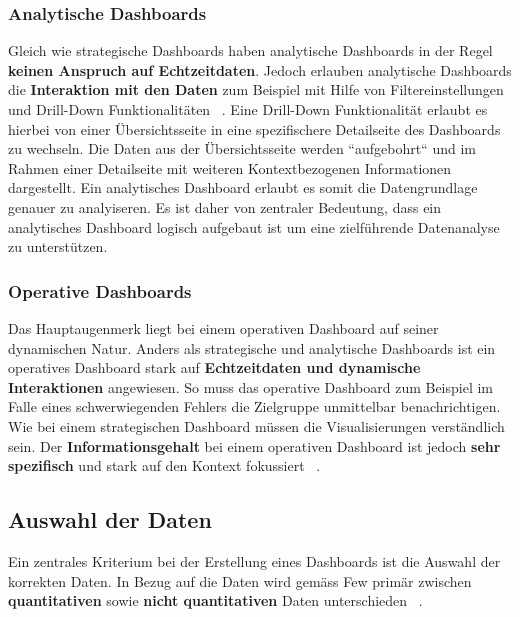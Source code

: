 \subsubsection{Analytische Dashboards}
Gleich wie strategische Dashboards haben analytische Dashboards in der Regel \textbf{keinen Anspruch auf Echtzeitdaten}. Jedoch erlauben analytische Dashboards die \textbf{Interaktion mit den Daten} zum Beispiel mit Hilfe von Filtereinstellungen und Drill-Down Funktionalitäten ~\citep[S. 41]{information_dashboard_design}. Eine Drill-Down Funktionalität erlaubt es hierbei von einer Übersichtsseite in eine spezifischere Detailseite des Dashboards zu wechseln. Die Daten aus der Übersichtsseite werden ``aufgebohrt`` und im Rahmen einer Detailseite mit weiteren Kontextbezogenen Informationen dargestellt. Ein analytisches Dashboard erlaubt es somit die Datengrundlage genauer zu analyiseren. Es ist daher von zentraler Bedeutung, dass ein analytisches Dashboard logisch aufgebaut ist um eine zielführende Datenanalyse zu unterstützen.

\subsubsection{Operative Dashboards}
Das Hauptaugenmerk liegt bei einem operativen Dashboard auf seiner dynamischen Natur. Anders als strategische und analytische Dashboards ist ein operatives Dashboard stark auf \textbf{Echtzeitdaten und dynamische Interaktionen} angewiesen. So muss das operative Dashboard zum Beispiel im Falle eines schwerwiegenden Fehlers die Zielgruppe unmittelbar benachrichtigen. Wie bei einem strategischen Dashboard müssen die Visualisierungen verständlich sein. Der \textbf{Informationsgehalt} bei einem operativen Dashboard ist jedoch \textbf{sehr spezifisch} und stark auf den Kontext fokussiert ~\citep[S. 42]{information_dashboard_design}.

\subsection{Auswahl der Daten} \label{ch:data_selection}
Ein zentrales Kriterium bei der Erstellung eines Dashboards ist die Auswahl der korrekten Daten. In Bezug auf die Daten wird gemäss Few primär zwischen \textbf{quantitativen} sowie \textbf{nicht quantitativen} Daten unterschieden ~\citep[S. 43 - 46]{information_dashboard_design}.

